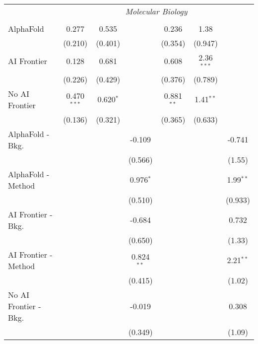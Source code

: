 \begin{tabular}{lcccccc}
 & \multicolumn{6}{c}{\textit{Molecular Biology}} \\ \\
   AlphaFold               & 0.277         & 0.535       &              & 0.236        & 1.38         &   \\   
                           & (0.210)       & (0.401)     &              & (0.354)      & (0.947)      &   \\   
   AI Frontier             & 0.128         & 0.681       &              & 0.608        & 2.36$^{***}$ &   \\   
                           & (0.226)       & (0.429)     &              & (0.376)      & (0.789)      &   \\   
   No AI Frontier          & 0.470$^{***}$ & 0.620$^{*}$ &              & 0.881$^{**}$ & 1.41$^{**}$  &   \\   
                           & (0.136)       & (0.321)     &              & (0.365)      & (0.633)      &   \\   
   AlphaFold - Bkg.        &               &             & -0.109       &              &              & -0.741\\   
                           &               &             & (0.566)      &              &              & (1.55)\\   
   AlphaFold - Method      &               &             & 0.976$^{*}$  &              &              & 1.99$^{**}$\\   
                           &               &             & (0.510)      &              &              & (0.933)\\   
   AI Frontier - Bkg.      &               &             & -0.684       &              &              & 0.732\\   
                           &               &             & (0.650)      &              &              & (1.33)\\   
   AI Frontier - Method    &               &             & 0.824$^{**}$ &              &              & 2.21$^{**}$\\   
                           &               &             & (0.415)      &              &              & (1.02)\\   
   No AI Frontier - Bkg.   &               &             & -0.019       &              &              & 0.308\\   
                           &               &             & (0.349)      &              &              & (1.09)\\   

\end{tabular}
